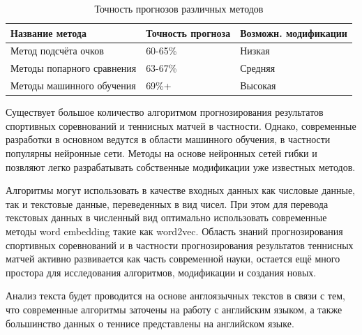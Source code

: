 \begin{table}[!h]
	
	\caption{\label{tab:table3}Точность прогнозов различных методов}
	
	\begin{center}
		\begin{tabular}{|l|l|l|}
			
			\hline
			
		 Название метода	& Точность прогноза & Возможн. модификации \\
			\hline
			Метод подсчёта очков  & 60-65\% & Низкая \\
			\hline
			Методы попарного сравнения  & 63-67\% & Средняя  \\
			\hline
			Методы машинного обучения  & 69\%+ & Высокая  \\
			\hline
			
		\end{tabular}
		
	\end{center}
	
\end{table}
Существует большое количество алгоритмом прогнозирования результатов спортивных соревнований и теннисных матчей в частности. Однако, современные разработки в основном ведутся в области машинного обучения, в частности  популярны нейронные сети. Методы на основе нейронных сетей гибки и позвляют легко разрабатывать собственные модификации уже известных методов.

Алгоритмы могут использовать в качестве входных данных как числовые данные, так и текстовые данные, переведенных в вид чисел.
 При этом для перевода текстовых данных  в численный вид оптимально использовать современные методы word embedding такие как word2vec.
 Область знаний прогнозирования спортивных соревнований и в частности прогнозирования результатов теннисных
 матчей активно развивается как часть современной науки, остается ещё много простора для исследования алгоритмов, модификации и со­здания новых.
 
Анализ текста будет проводится на основе англоязычных текстов в связи с тем, что современные алгоритмы заточены на работу с английским языком, а также большинство данных о теннисе представлены на английском языке.